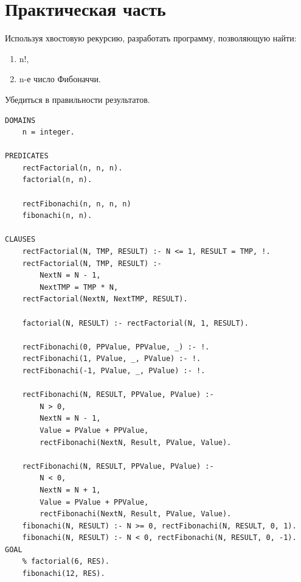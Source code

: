 \chapter{Практическая часть}
Используя хвостовую рекурсию, разработать программу, позволяющую найти:

\begin{enumerate}
	\item n!,
	\item n-е число Фибоначчи.
\end{enumerate}
Убедиться в правильности результатов.

\begin{lstlisting}[caption=Программа <<Факториал>> и <<Фибоначи>>]
DOMAINS 
	n = integer.

PREDICATES
	rectFactorial(n, n, n).
	factorial(n, n).
	
	rectFibonachi(n, n, n, n)
	fibonachi(n, n).

CLAUSES
	rectFactorial(N, TMP, RESULT) :- N <= 1, RESULT = TMP, !.
	rectFactorial(N, TMP, RESULT) :- 
		NextN = N - 1,
		NextTMP = TMP * N,
	rectFactorial(NextN, NextTMP, RESULT).
	
	factorial(N, RESULT) :- rectFactorial(N, 1, RESULT).
	
	rectFibonachi(0, PPValue, PPValue, _) :- !.
	rectFibonachi(1, PValue, _, PValue) :- !.
	rectFibonachi(-1, PValue, _, PValue) :- !.
	
	rectFibonachi(N, RESULT, PPValue, PValue) :-
		N > 0,
		NextN = N - 1, 
		Value = PValue + PPValue,
		rectFibonachi(NextN, Result, PValue, Value). 
	
	rectFibonachi(N, RESULT, PPValue, PValue) :-
		N < 0,
		NextN = N + 1, 
		Value = PValue + PPValue,
		rectFibonachi(NextN, Result, PValue, Value).
	fibonachi(N, RESULT) :- N >= 0, rectFibonachi(N, RESULT, 0, 1).
	fibonachi(N, RESULT) :- N < 0, rectFibonachi(N, RESULT, 0, -1).
GOAL
	% factorial(6, RES).
	fibonachi(12, RES).
\end{lstlisting}